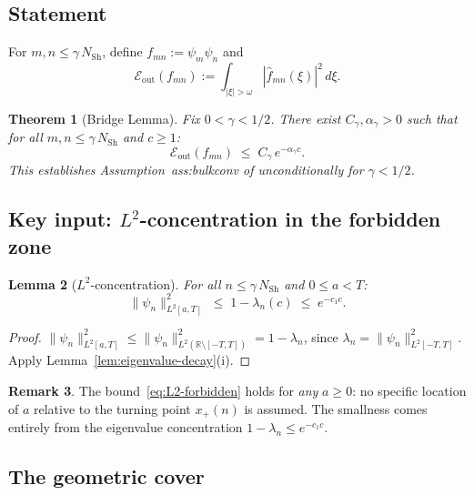 \documentclass[12pt,a4paper]{article}
\newtheorem{theorem}{Theorem}[section]
\newtheorem{lemma}[theorem]{Lemma}
\theoremstyle{definition}
\newtheorem{remark}[theorem]{Remark}
\newcommand{\NSh}{N_{\mathrm{Sh}}}
\newcommand{\Eout}{\mathcal{E}_{\mathrm{out}}}
\begin{document}
\subsection{Statement}

For $m,n \le \gamma\,\NSh$, define
$f_{mn} := \psi_m\psi_n$ and
\[
  \Eout(f_{mn})
  := \int_{|\xi|>\omega}|\widehat{f}_{mn}(\xi)|^2\,d\xi.
\]

\begin{theorem}[Bridge Lemma]
\label{thm:bridge}
Fix $0 < \gamma < 1/2$.
There exist $C_\gamma, \alpha_\gamma > 0$ such that
for all $m,n \le \gamma\,\NSh$ and $c \ge 1$:
\begin{equation}
\label{eq:bridge:main}
  \Eout(f_{mn}) \;\le\; C_\gamma\,e^{-\alpha_\gamma c}.
\end{equation}
This establishes Assumption~ass:bulkconv of \cite{PaperIII}
unconditionally for $\gamma < 1/2$.
\end{theorem}

\subsection{Key input: $L^2$-concentration in the
forbidden zone}

\begin{lemma}[$L^2$-concentration]
\label{lem:L2-forbidden}
For all $n \le \gamma\,\NSh$ and $0 \le a < T$:
\begin{equation}
\label{eq:L2-forbidden}
  \|\psi_n\|_{L^2[a,T]}^2
  \;\le\; 1 - \lambda_n(c)
  \;\le\; e^{-c_1 c}.
\end{equation}
\end{lemma}

\begin{proof}
$\|\psi_n\|_{L^2[a,T]}^2
\le \|\psi_n\|_{L^2(\mathbb{R}\setminus[-T,T])}^2
= 1 - \lambda_n$,
since $\lambda_n = \|\psi_n\|_{L^2[-T,T]}^2$.
Apply Lemma~\ref{lem:eigenvalue-decay}(i).
\end{proof}

\begin{remark}
The bound~\eqref{eq:L2-forbidden} holds for \emph{any}
$a \ge 0$: no specific location of $a$ relative to the
turning point $x_+(n)$ is assumed.
The smallness comes entirely from the eigenvalue
concentration $1-\lambda_n \le e^{-c_1 c}$.
\end{remark}

\subsection{The geometric cover}
\end{document}
